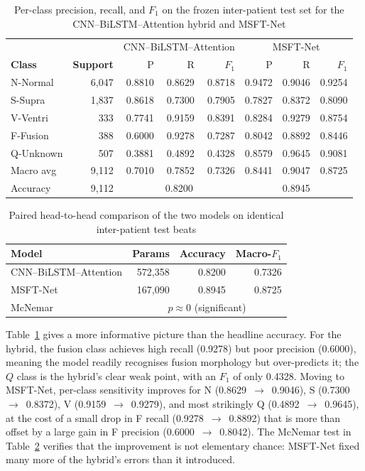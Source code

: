 \begin{table}[!t]
\centering
\caption{Per-class precision, recall, and $F_1$ on the frozen inter-patient test set for the CNN--BiLSTM--Attention hybrid and MSFT-Net}
\label{tab:perclass}
\begin{tabular}{lrrrrrrr}
\toprule
 & & \multicolumn{3}{c}{CNN--BiLSTM--Attention} & \multicolumn{3}{c}{MSFT-Net} \\
\textbf{Class} & \textbf{Support} & P & R & $F_1$ & P & R & $F_1$ \\
\midrule
N-Normal   & 6{,}047 & 0.8810 & 0.8629 & 0.8718 & 0.9472 & 0.9046 & 0.9254 \\
S-Supra    & 1{,}837 & 0.8618 & 0.7300 & 0.7905 & 0.7827 & 0.8372 & 0.8090 \\
V-Ventri   &   333   & 0.7741 & 0.9159 & 0.8391 & 0.8284 & 0.9279 & 0.8754 \\
F-Fusion   &   388   & 0.6000 & 0.9278 & 0.7287 & 0.8042 & 0.8892 & 0.8446 \\
Q-Unknown  &   507   & 0.3881 & 0.4892 & 0.4328 & 0.8579 & 0.9645 & 0.9081 \\
\midrule
Macro avg  & 9{,}112 & 0.7010 & 0.7852 & 0.7326 & 0.8441 & 0.9047 & 0.8725 \\
Accuracy   & 9{,}112 & \multicolumn{3}{c}{0.8200} & \multicolumn{3}{c}{0.8945} \\
\bottomrule
\end{tabular}
\end{table}

\begin{table}[!t]
\centering
\caption{Paired head-to-head comparison of the two models on identical inter-patient test beats}
\label{tab:headtohead}
\begin{tabular}{lrrr}
\toprule
\textbf{Model} & \textbf{Params} & \textbf{Accuracy} & \textbf{Macro-$F_1$} \\
\midrule
CNN--BiLSTM--Attention & 572{,}358 & 0.8200 & 0.7326 \\
MSFT-Net               & 167{,}090 & 0.8945 & 0.8725 \\
\midrule
McNemar & \multicolumn{3}{c}{$p \approx 0$ (significant)} \\
\bottomrule
\end{tabular}
\end{table}

Table~\ref{tab:perclass} gives a more informative picture than the headline
accuracy. For the hybrid, the fusion class achieves high recall (0.9278) but
poor precision (0.6000), meaning the model readily recognises fusion
morphology but over-predicts it; the $Q$ class is the hybrid's clear weak
point, with an $F_1$ of only 0.4328. Moving to MSFT-Net, per-class
sensitivity improves for N (0.8629~$\rightarrow$~0.9046), S
(0.7300~$\rightarrow$~0.8372), V (0.9159~$\rightarrow$~0.9279), and most
strikingly Q (0.4892~$\rightarrow$~0.9645), at the cost of a small drop in F
recall (0.9278~$\rightarrow$~0.8892) that is more than offset by a large
gain in F precision (0.6000~$\rightarrow$~0.8042). The McNemar test in
Table~\ref{tab:headtohead} verifies that the improvement is not elementary
chance: MSFT-Net fixed many more of the hybrid's errors than it introduced.

